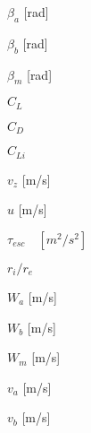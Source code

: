 \begin{figure}[H]
	\centering
	
	\caption{$\beta_a$ [rad]}
\end{figure}
\begin{figure}[H]
	\centering
	
	\caption{$\beta_b$ [rad]}
\end{figure}
\begin{figure}[H]
	\centering
	
	\caption{$\beta_m$ [rad]}
\end{figure}
\begin{figure}[H]
	\centering
	
	\caption{$C_L$}
\end{figure}
\begin{figure}[H]
	\centering
	
	\caption{$C_D$}
\end{figure}
\begin{figure}[H]
	\centering
	
	\caption{$C_{Li}$}
\end{figure}
\begin{figure}[H]
	\centering
	
	\caption{$v_z$ [m/s]}
\end{figure}
\begin{figure}[H]
	\centering
	
	\caption{$u$ [m/s]}
\end{figure}
\begin{figure}[H]
	\centering
	
	\caption{$\tau_{esc}\quad [m^2/s^2]$}
\end{figure}
\begin{figure}[H]
	\centering
	
	\caption{$r_i/r_e$}
\end{figure}
\begin{figure}[H]
	\centering
	
	\caption{$W_a$ [m/s]}
\end{figure}
\begin{figure}[H]
	\centering
	
	\caption{$W_b$ [m/s]}
\end{figure}
\begin{figure}[H]
	\centering
	
	\caption{$W_m$ [m/s]}
\end{figure}
\begin{figure}[H]
	\centering
	
	\caption{$v_a$ [m/s]}
\end{figure}
\begin{figure}[H]
	\centering
	
	\caption{$v_b$ [m/s]}
\end{figure}
